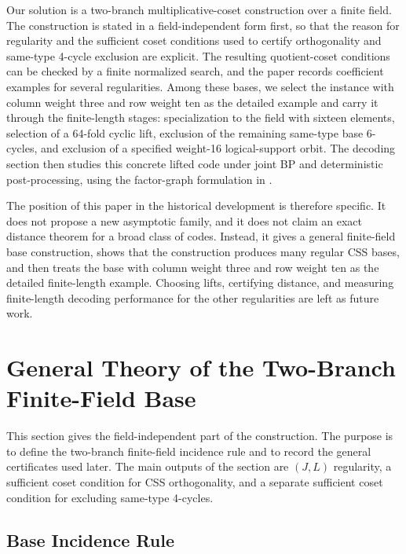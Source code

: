 \documentclass[11pt,a4paper]{article}
\theoremstyle{uprighttheorem}
\begin{document}
Our solution is a two-branch multiplicative-coset construction over a finite field.
The construction is stated in a field-independent form first, so that the reason for regularity and the sufficient coset conditions used to certify orthogonality and same-type 4-cycle exclusion are explicit.
The resulting quotient-coset conditions can be checked by a finite normalized search, and the paper records coefficient examples for several regularities.
Among these bases, we select the instance with column weight three and row weight ten as the detailed example and carry it through the finite-length stages: specialization to the field with sixteen elements, selection of a 64-fold cyclic lift, exclusion of the remaining same-type base 6-cycles, and exclusion of a specified weight-16 logical-support orbit.
The decoding section then studies this concrete lifted code under joint BP and deterministic post-processing, using the factor-graph formulation in \cite{kasai2026factorgraph}.

The position of this paper in the historical development is therefore specific.
It does not propose a new asymptotic family, and it does not claim an exact distance theorem for a broad class of codes.
Instead, it gives a general finite-field base construction, shows that the construction produces many regular CSS bases, and then treats the base with column weight three and row weight ten as the detailed finite-length example.
Choosing lifts, certifying distance, and measuring finite-length decoding performance for the other regularities are left as future work.

\section{General Theory of the Two-Branch Finite-Field Base}\label{sec:general-theory}
This section gives the field-independent part of the construction.
The purpose is to define the two-branch finite-field incidence rule and to record the general certificates used later.
The main outputs of the section are \((J,L)\) regularity, a sufficient coset condition for CSS orthogonality, and a separate sufficient coset condition for excluding same-type 4-cycles.

\subsection{Base Incidence Rule}\label{subsec:base-incidence-rule}
\end{document}
